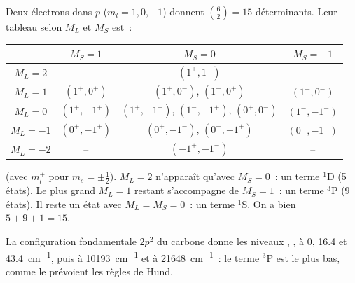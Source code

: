 \begin{example}\label{ex:b3:many-electron-atoms:p2}
Deux électrons dans $p$ ($m_l = 1, 0, -1$) donnent $\binom62 = 15$
déterminants. Leur tableau selon $M_L$ et $M_S$ est~:
\begin{center}\small
\begin{tabular}{c|ccc}
\hline
 & $M_S = 1$ & $M_S = 0$ & $M_S = -1$\\ \hline
$M_L = 2$ & -- & $(1^+,1^-)$ & --\\
$M_L = 1$ & $(1^+,0^+)$ & $(1^+,0^-)$, $(1^-,0^+)$ & $(1^-,0^-)$\\
$M_L = 0$ & $(1^+,-1^+)$ & $(1^+,-1^-)$, $(1^-,-1^+)$, $(0^+,0^-)$ & $(1^-,-1^-)$\\
$M_L = -1$ & $(0^+,-1^+)$ & $(0^+,-1^-)$, $(0^-,-1^+)$ & $(0^-,-1^-)$\\
$M_L = -2$ & -- & $(-1^+,-1^-)$ & --\\ \hline
\end{tabular}
\end{center}
(avec $m_l^\pm$ pour $m_s = \pm\frac12$). $M_L = 2$ n'apparaît qu'avec $M_S = 0$~:
un terme ${}^1$D (5 états). Le plus grand $M_L = 1$ restant
s'accompagne de
$M_S = 1$~: un terme ${}^3$P (9 états). Il reste un état avec
$M_L = M_S = 0$~: un terme
${}^1$S. On a bien $5 + 9 + 1 = 15$.
\end{example}

\begin{example}\label{ex:b3:many-electron-atoms:carbon}
La configuration fondamentale $2p^2$ du carbone donne les niveaux ,
,  à 0, 16.4 et \qty{43.4}{cm^{-1}},
puis
 à \qty{10193}{cm^{-1}} et  à
\qty{21648}{cm^{-1}}~: le terme ${}^3$P est le plus bas, comme le
prévoient les règles de Hund.
\end{example}

